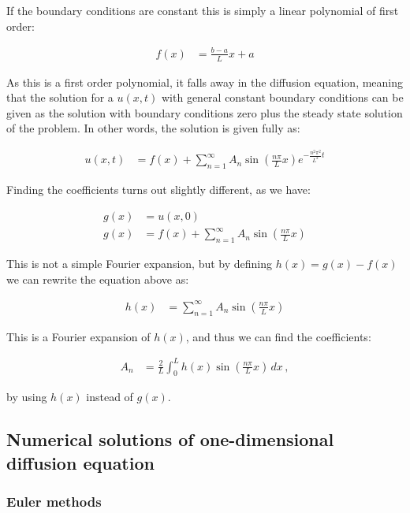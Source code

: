 \documentclass[reprint,english,notitlepage]{revtex4-1}  %
\begin{document}
If the boundary conditions are constant this is simply a linear polynomial of first order:

\begin{align*}
f(x) &= \frac{b-a}{L} x + a
\end{align*}

As this is a first order polynomial, it falls away in the diffusion equation, meaning that the solution for a $u(x,t)$ with general constant boundary conditions can be given as the solution with boundary conditions zero plus the steady state solution of the problem. In other words, the solution is given fully as:

\begin{align*}
u(x,t) &= f(x) + \sum\limits_{n=1}^\infty A_n \sin( \frac{n\pi}{L} x) e^{-\frac{n^2 \pi^2}{L^2} t}
\end{align*}

Finding the coefficients turns out slightly different, as we have:

\begin{align*}
g(x) &= u(x,0) \\
g(x) &= f(x) + \sum\limits_{n=1}^\infty A_n \sin( \frac{n\pi}{L} x)
\end{align*}

This is not a simple Fourier expansion, but by defining $h(x) = g(x) - f(x)$ we can rewrite the equation above as:

\begin{align*}
h(x) &= \sum\limits_{n=1}^\infty A_n \sin( \frac{n\pi}{L} x)
\end{align*}

This is a Fourier expansion of $h(x)$, and thus we can find the coefficients:

\begin{align*}
A_n &= \frac{2}{L} \int_0^L h(x) \sin (\frac{n\pi}{L} x) \, dx \, ,
\end{align*}

by using $h(x)$ instead of $g(x)$. 


\subsection{Numerical solutions of one-dimensional diffusion equation} \label{sec:formalism_numerical_1D}

\subsubsection{Euler methods} \label{sec:formalism_euler_methods}
\end{document}
